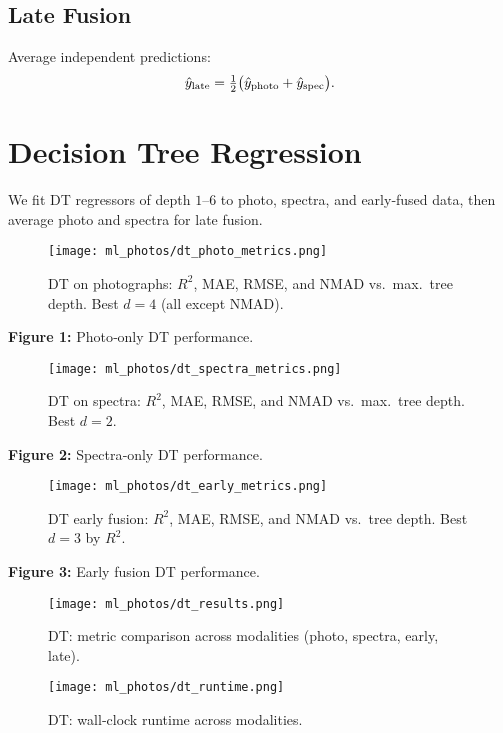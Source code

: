 \documentclass[english,bachelor,oneside]{ctufit-thesis}
\begin{document}
\subsection{Late Fusion}
Average independent predictions:
\[
  \hat{y}_{\rm late}
  = \tfrac12\bigl(\hat{y}_{\rm photo} + \hat{y}_{\rm spec}\bigr).
\]

\section{Decision Tree Regression}
We fit DT regressors of depth $1$--$6$ to photo, spectra, and early‐fused data, then average photo and spectra for late fusion.

\begin{figure}[H]
  \centering
  \texttt{[image: ml\_photos/dt\_photo\_metrics.png]}
  \caption{DT on photographs: $R^2$, MAE, RMSE, and NMAD vs.\ max.\ tree depth. Best $d=4$ (all except NMAD).}
  \label{fig:dt_photo_metrics}
\end{figure}
\noindent\textbf{Figure 1:} Photo‐only DT performance.\\

\begin{figure}[H]
  \centering
  \texttt{[image: ml\_photos/dt\_spectra\_metrics.png]}
  \caption{DT on spectra: $R^2$, MAE, RMSE, and NMAD vs.\ max.\ tree depth. Best $d=2$.}
  \label{fig:dt_spectra_metrics}
\end{figure}
\noindent\textbf{Figure 2:} Spectra‐only DT performance.\\

\begin{figure}[H]
  \centering
  \texttt{[image: ml\_photos/dt\_early\_metrics.png]}
  \caption{DT early fusion: $R^2$, MAE, RMSE, and NMAD vs.\ tree depth. Best $d=3$ by $R^2$.}
  \label{fig:dt_early_metrics}
\end{figure}
\noindent\textbf{Figure 3:} Early fusion DT performance.\\

\begin{figure}[H]
  \centering
  \texttt{[image: ml\_photos/dt\_results.png]}
  \caption{DT: metric comparison across modalities (photo, spectra, early, late).}
  \label{fig:dt_results}
\end{figure}

\begin{figure}[H]
  \centering
  \texttt{[image: ml\_photos/dt\_runtime.png]}
  \caption{DT: wall‐clock runtime across modalities.}
  \label{fig:dt_runtime}
\end{figure}
\end{document}
